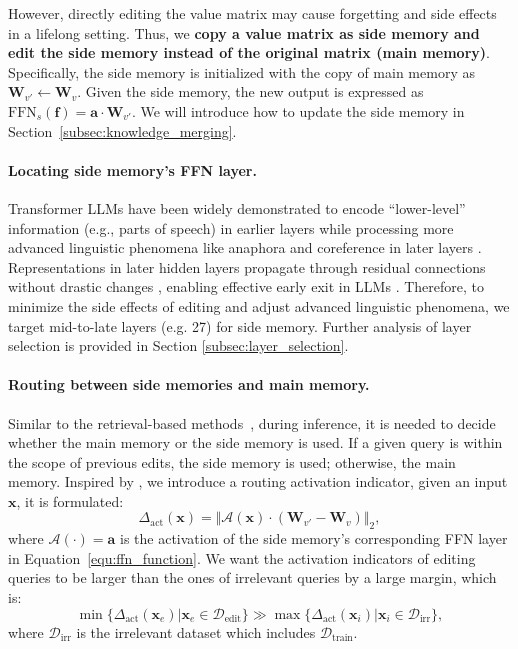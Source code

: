 However, directly editing the value matrix may cause forgetting and side effects in a lifelong setting. 
Thus, we \textbf{copy a value matrix as side memory and edit the side memory instead of the original matrix (main memory)}.
Specifically, the side memory is initialized with the copy of main memory as $\mathbf{W}_{v'} \leftarrow \mathbf{W}_{v}$. 
Given the side memory, the new output is expressed as $\text{FFN}_{s}(\mathbf{f}) = \mathbf{a} \cdot \mathbf{W}_{v'}$. 
We will introduce how to update the side memory in Section~\ref{subsec:knowledge_merging}.

\paragraph{Locating side memory's FFN layer.} \label{subsec:locating_side_memory}
Transformer LLMs have been widely demonstrated to encode  ``lower-level'' information (e.g., parts of speech) in earlier layers while processing more advanced linguistic phenomena like anaphora and coreference in later layers \cite{early_layer_1,early_layer_2,early_layer_3}.
Representations in later hidden layers propagate through residual connections without drastic changes \cite{dola, rome}, enabling effective early exit in LLMs \cite{shortgpt, confident_adaptive}.
Therefore, to minimize the side effects of editing and adjust advanced linguistic phenomena, we target mid-to-late layers (e.g. 27) for side memory. Further analysis of layer selection is provided in Section \ref{subsec:layer_selection}.



\paragraph{Routing between side memories and main memory.} 
Similar to the retrieval-based methods~\cite{grace,serac}, during inference, it is needed to decide whether the main memory or the side memory is used. If a given query is within the scope of previous edits, the side memory is used; otherwise, the main memory. 
Inspired by \cite{t-patcher}, we introduce a routing activation indicator, given an input $\mathbf{x}$, it is formulated:
\begin{equation}
    \Delta_{\text{act}}(\mathbf{x}) = \Vert \mathcal{A}(\mathbf{x}) \cdot (\mathbf{W}_{v'} - \mathbf{W}_v) \Vert_2, 
    \label{equ:routing_activation}
\end{equation}
where $\mathcal{A}(\cdot) = \mathbf{a}$ is the activation of the side memory's corresponding FFN layer in Equation~\ref{equ:ffn_function}. We want the activation indicators of editing queries to be larger than the ones of irrelevant queries by a large margin, which is:
\begin{equation}
    \min \{\Delta_{\text{act}}(\mathbf{x}_e)| \mathbf{x}_e \in \mathcal{D}_{\text{edit}}\} \gg \max \{\Delta_{\text{act}}(\mathbf{x}_i)| \mathbf{x}_i \in \mathcal{D}_{\text{irr}}\},
\end{equation}
where $\mathcal{D}_{\text{irr}}$ is the irrelevant dataset which includes $\mathcal{D}_{\text{train}}$. 

